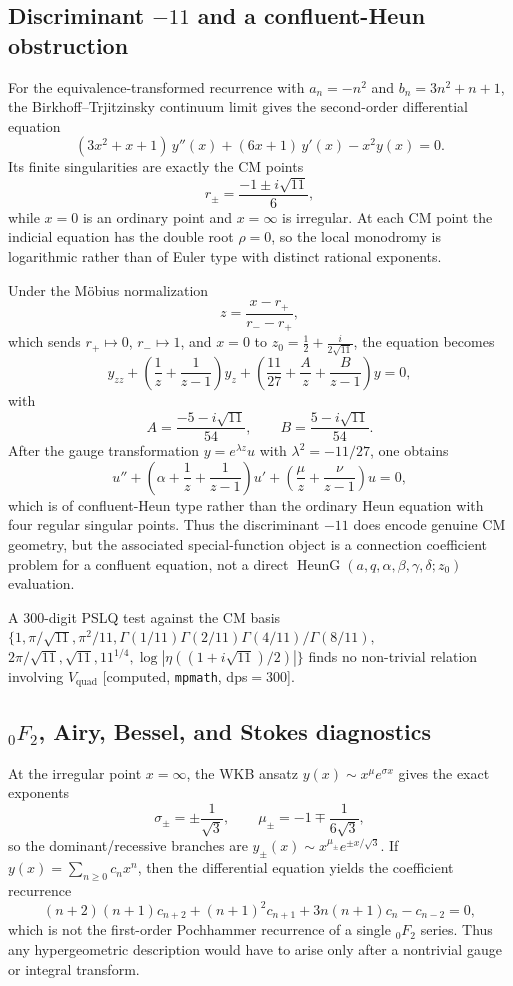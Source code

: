 \documentclass[11pt,a4paper]{article}
\theoremstyle{definition}
\theoremstyle{remark}
\begin{document}
\subsection{Discriminant \texorpdfstring{$-11$}{-11} and a confluent-Heun obstruction}\label{subsec:vquad-heun}

For the equivalence-transformed recurrence with $a_n=-n^2$ and
$b_n=3n^2+n+1$, the Birkhoff--Trjitzinsky continuum limit gives the
second-order differential equation
\[
  (3x^2+x+1)\,y''(x) + (6x+1)\,y'(x) - x^2 y(x) = 0.
\]
Its finite singularities are exactly the CM points
\[
  r_{\pm}=\frac{-1\pm i\sqrt{11}}{6},
\]
while $x=0$ is an ordinary point and $x=\infty$ is irregular. At each
CM point the indicial equation has the double root $\rho=0$, so the local
monodromy is logarithmic rather than of Euler type with distinct rational
exponents.

Under the M\"obius normalization
\[
  z=\frac{x-r_{+}}{r_{-}-r_{+}},
\]
which sends $r_{+}\mapsto 0$, $r_{-}\mapsto 1$, and $x=0$ to
$z_0=\tfrac12 + \tfrac{i}{2\sqrt{11}}$, the equation becomes
\[
  y_{zz} + \left(\frac1z + \frac1{z-1}\right)y_z
  + \left(\frac{11}{27} + \frac{A}{z} + \frac{B}{z-1}\right)y = 0,
\]
with
\[
  A=\frac{-5-i\sqrt{11}}{54},
  \qquad
  B=\frac{5-i\sqrt{11}}{54}.
\]
After the gauge transformation $y=e^{\lambda z}u$ with
$\lambda^2=-11/27$, one obtains
\[
  u'' + \left(\alpha + \frac1z + \frac1{z-1}\right)u'
  + \left(\frac{\mu}{z} + \frac{\nu}{z-1}\right)u = 0,
\]
which is of confluent-Heun type rather than the ordinary Heun equation with
four regular singular points. Thus the discriminant $-11$ does encode genuine
CM geometry, but the associated special-function object is a connection
coefficient problem for a confluent equation, not a direct
$\operatorname{HeunG}(a,q,\alpha,\beta,\gamma,\delta;z_0)$ evaluation.

A 300-digit PSLQ test against the CM basis
$\{1,\pi/\sqrt{11},\pi^2/11,\Gamma(1/11)\Gamma(2/11)\Gamma(4/11)/\Gamma(8/11),$
$2\pi/\sqrt{11},\sqrt{11},11^{1/4},\log|\eta((1+i\sqrt{11})/2)|\}$
finds no non-trivial relation involving $V_{\mathrm{quad}}$
[computed, \texttt{mpmath}, dps$=300$].

\subsection{\texorpdfstring{${}_0F_2$}{0F2}, Airy, Bessel, and Stokes diagnostics}\label{subsec:vquad-stokes}

At the irregular point $x=\infty$, the WKB ansatz
$y(x)\sim x^{\mu}e^{\sigma x}$ gives the exact exponents
\[
  \sigma_{\pm}=\pm \frac{1}{\sqrt{3}},
  \qquad
  \mu_{\pm}=-1 \mp \frac{1}{6\sqrt{3}},
\]
so the dominant/recessive branches are
$y_{\pm}(x)\sim x^{\mu_{\pm}}e^{\pm x/\sqrt{3}}$.
If $y(x)=\sum_{n\ge 0} c_n x^n$, then the differential equation yields the
coefficient recurrence
\[
  (n+2)(n+1)c_{n+2} + (n+1)^2 c_{n+1} + 3n(n+1)c_n - c_{n-2}=0,
\]
which is not the first-order Pochhammer recurrence of a single
${}_0F_2$ series. Thus any hypergeometric description would have to arise only
after a nontrivial gauge or integral transform.
\end{document}
